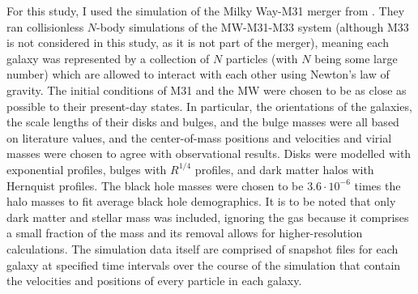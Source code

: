 \documentclass[twocolumn]{aastex631}
\begin{document}
For this study, I used the simulation of the Milky Way-M31 merger from \cite{van_der_Marel+2012}.
They ran collisionless $N$-body simulations of the MW-M31-M33 system (although M33 is not considered in this study, as it is not part of the merger), meaning each galaxy was represented by a collection of $N$ particles (with $N$ being some large number) which are allowed to interact with each other using Newton's law of gravity.
The initial conditions of M31 and the MW were chosen to be as close as possible to their present-day states. 
In particular, the orientations of the galaxies, the scale lengths of their disks and bulges, and the bulge masses were all based on literature values, and the center-of-mass positions and velocities and virial masses were chosen to agree with observational results.
Disks were modelled with exponential profiles, bulges with $R^{1/4}$ profiles, and dark matter halos with Hernquist profiles. 
The black hole masses were chosen to be $3.6 \cdot 10^{-6}$ times the halo masses to fit average black hole demographics.
It is to be noted that only dark matter and stellar mass was included, ignoring the gas because it comprises a small fraction of the mass and its removal allows for higher-resolution calculations.
The simulation data itself are comprised of snapshot files for each galaxy at specified time intervals over the course of the simulation that contain the velocities and positions of every particle in each galaxy.
\end{document}
